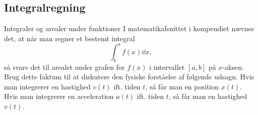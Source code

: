 \subsection*{Integralregning}
\begin{opgave}[1]{Integraler og arealer under funktioner}
I matematikafsnittet i kompendiet nævnes det, at når man regner et bestemt integral
\begin{equation*}
\int^a_b{f(x)}\dd{x},
\end{equation*}
så svare det til arealet under grafen for $f(x)$ i intervallet $[a,b]$ på $x$-aksen. Brug dette faktum til at diskutere den fysiske forståelse af følgende udsagn.
\opg Hvis man integrerer en hastighed $v(t)$ ift. tiden $t$, så får man en position $x(t)$.
\opg Hvis man integrerer en acceleration $a(t)$ ift. tiden $t$, så får man en hastighed $v(t)$.
\end{opgave}


